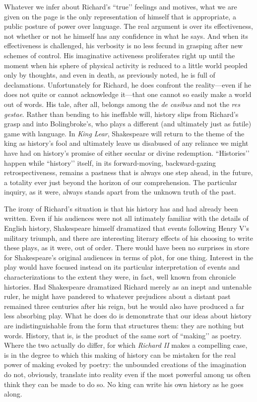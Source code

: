 Whatever we infer about Richard’s ``true’’ feelings and motives, what we are given on the page is the only representation of himself that is appropriate, a public posture of power over language.
The real argument is over its effectiveness, not whether or not he himself has any confidence in what he says.
And when its effectiveness is challenged, his verbosity is no less fecund in grasping after new schemes of control.
His imaginative activeness proliferates right up until the moment when his sphere of physical activity is reduced to a little world peopled only by thoughts, and even in death, as previously noted, he is full of declamations.
Unfortunately for Richard, he does confront the reality---even if he does not quite or cannot acknowledge it---that one cannot so easily make a world out of words.
His tale, after all, belongs among the \emph{de casibus} and not the \emph{res gestae}.
Rather than bending to his ineffable will, history slips from Richard’s grasp and into Bolingbroke’s, who plays a different (and ultimately just as futile) game with language.
In \emph{King Lear}, Shakespeare will return to the theme of the king as history’s fool and ultimately leave us disabused of any reliance we might have had on history’s promise of either secular or divine redemption.
``Histories’’ happen while ``history’’ itself, in its forward-moving, backward-gazing retrospectiveness, remains a pastness that is always one step ahead, in the future, a totality ever just beyond the horizon of our comprehension.
The particular inquiry, as it were, always stands apart from the unknown truth of the past.

The irony of Richard’s situation is that his history has and had already been written.
Even if his audiences were not all intimately familiar with the details of English history, Shakespeare himself dramatized that events following Henry V’s military triumph, and there are interesting literary effects of his choosing to write these plays, as it were, out of order.
There would have been no surprises in store for Shakespeare’s original audiences in terms of plot, for one thing.
Interest in the play would have focused instead on its particular interpretation of events and characterizations to the extent they were, in fact, well known from chronicle histories.
Had Shakespeare dramatized Richard merely as an inept and untenable ruler, he might have pandered to whatever prejudices about a distant past remained three centuries after his reign, but he would also have produced a far less absorbing play.
What he does do is demonstrate that our ideas about history are indistinguishable from the form that structures them: they are nothing but words.
History, that is, is the product of the same sort of ``making’’ as poetry.
Where the two actually do differ, for which \emph{Richard II} makes a compelling case, is in the degree to which this making of history can be mistaken for the real power of making evoked by poetry: the unbounded creations of the imagination do not, obviously, translate into reality even if the most powerful among us often think they can be made to do so.
No king can write his own history as he goes along.

